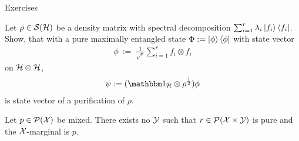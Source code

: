 \begin{section}{Exercises}
    \begin{exercise}
	  Let $\rho \in {\mathcal S}({\mathcal H})$ be a density matrix with spectral decomposition $\sum_{i=1}^r \lambda_i \ket{f_i}\bra{f_i}$. Show, that with a pure maximally entangled state $\Phi := \ket{\phi}\bra{\phi}$ with state vector
	  \begin{align*}
	   \phi \ := \ \frac{1}{\sqrt{r}} \sum_{i=1}^{r} f_i \otimes f_i
	  \end{align*} 
	  on ${\mathcal H} \otimes {\mathcal H}$, 
	  \begin{align*}
		 \psi := (\bbmeins_{\cH} \otimes \rho^{\frac{1}{2}})\phi 
	  \end{align*}
	  is state vector of a purification of $\rho$.
    \end{exercise}
	\begin{exercise} \label{ex:class_pur}
	Let $p \in {\mathcal P}({\mathcal X})$ be mixed. There exists no ${\mathcal Y}$ such that $r \in {\mathcal P}({\mathcal X} \times {\mathcal Y})$ is pure and the ${\mathcal X}$-marginal is $p$.
	\end{exercise}
   \end{section}
   
    

 
 
 
  
 
 
   
